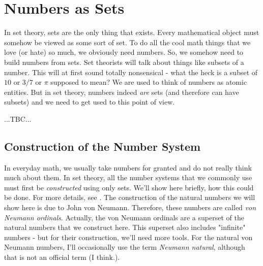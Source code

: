 \section{Numbers as Sets}
In set theory, sets are the only thing that exists. Every mathematical object must somehow be viewed as some sort of set. To do all the cool math things that we love (or hate) so much, we obviously need numbers. So, we somehow need to build numbers from sets. Set theorists will talk about things like subsets of a number. This will at first sound totally nonsensical - what the heck is a subset of $10$ or $3/7$ or $\pi$ supposed to mean? We are used to think of numbers as atomic entities. But in set theory, numbers indeed \emph{are} sets (and therefore can have subsets) and we need to get used to this point of view.

% 

...TBC... 



\subsection{Construction of the Number System}
In everyday math, we usually take numbers for granted and do not really think much about them. In set theory, all the number systems that we commonly use must first be \emph{constructed} using only sets. We'll show here briefly, how this could be done. For more details, see \cite{PDF_MathFAQ}. The construction of the natural numbers we will show here is due to John von Neumann. Therefore, these numbers are called \emph{von Neumann ordinals}. Actually, the von Neumann ordinals are a superset of the natural numbers that we construct here. This superset also includes "infinite" numbers - but for their construction, we'll need more tools. For the natural von Neumann numbers, I'll occasionally use the term \emph{Neumann natural}, although that is not an official term (I think.).



